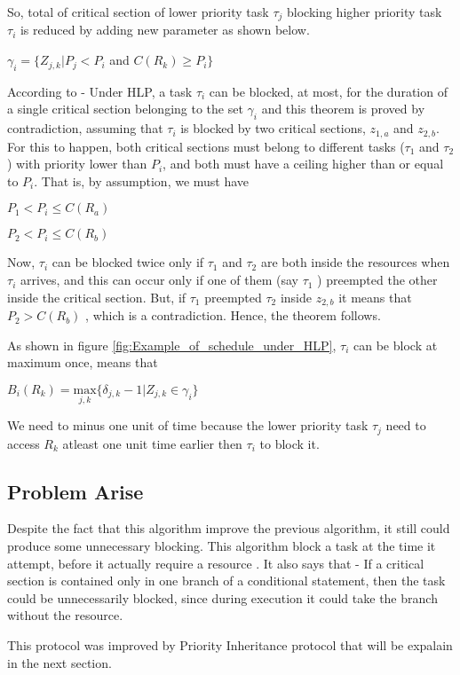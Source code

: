 So, total of critical section of lower priority task $\tau_{j}$ blocking higher priority task $\tau_{i}$ is reduced by adding new parameter as shown below.

\begin{center}
$ \gamma_{i}=\{Z_{j,k} | P_{j}<P_{i} $ and $ C(R_{k})\geq P_{i} \} $
\end{center}

According to \cite{b5} - Under HLP, a task $ \tau_{i} $ can be blocked, at most, for the duration of a single critical section belonging to the set $ \gamma_{i} $ and this theorem is proved by contradiction, assuming that $ \tau_{i} $ is blocked by two critical sections, $ z_{1,a} $ and $ z_{2,b} $. For this to happen, both critical sections must belong to different tasks ($ \tau_{1} $ and $ \tau_{2} $) with priority lower than $ P_{i} $, and both must have a ceiling higher than or equal to $ P_{i} $. That is, by assumption, we must have

\begin{center}
$ P_{1}< P_{i}\leq C(R_{a})$

$ P_{2}< P_{i}\leq C(R_{b})$
\end{center}

Now, $ \tau_{i} $  can be blocked twice only if $ \tau_{1} $  and $ \tau_{2} $  are both inside the resources when $ \tau_{i} $ arrives, and this can occur only if one of them (say $ \tau_{1} $ ) preempted the other inside the critical section. But, if $ \tau_{1} $  preempted $ \tau_{2} $ inside $ z_{2,b} $  it means that $ P_{2}> C(R_{b}) $ , which is a contradiction. Hence, the theorem follows.

As shown in figure \ref{fig:Example_of_schedule_under_HLP}, $ \tau_{i} $ can be block at maximum once, means that

\begin{center}
$B_{i}(R_{k})=\underset{j,k}{\mathrm{max}} \{ \delta_{j,k}-1 | Z_{j,k} \in \gamma_{i}\}  $
\end{center}

We need to minus one unit of time because the lower priority task $ \tau_{j} $ need to access $ R_{k} $ atleast one unit time earlier then $ \tau_{i} $ to block it.

\subsection{Problem Arise}

Despite the fact that this algorithm improve the previous algorithm, it still could produce some unnecessary blocking. This algorithm block a task at the time it attempt, before it actually require a resource \cite{b5}. It also says that - If a critical section is contained only in one branch of a conditional statement, then the task could be unnecessarily blocked, since during execution it could take the branch without the resource.

This protocol was improved by Priority Inheritance protocol that will be expalain in the next section.
 










